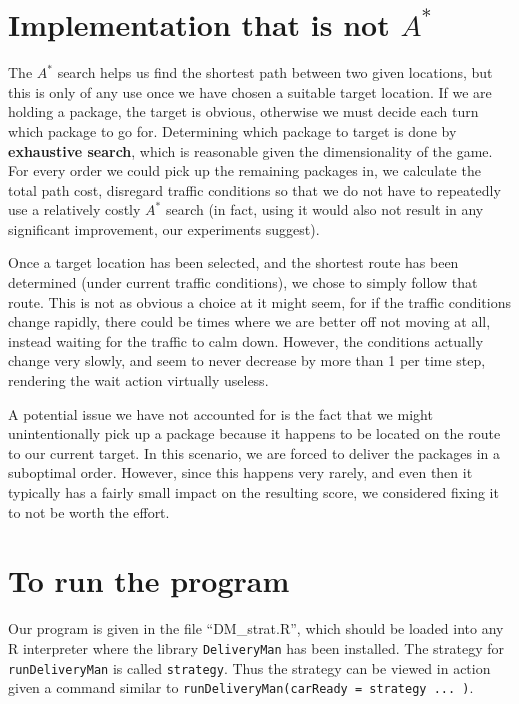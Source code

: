 \section{Implementation that is not $A^*$}

The $A^*$ search helps us find the shortest path between two given locations, but this is only of any use once we have chosen a suitable target location. If we are holding a package, the target is obvious, otherwise we must decide each turn which package to go for. Determining which package to target is done by \textbf{exhaustive search}, which is reasonable given the dimensionality of the game. For every order we could pick up the remaining packages in, we calculate the total path cost, disregard traffic conditions so that we do not have to repeatedly use a relatively costly $A^*$ search (in fact, using it would also not result in any significant improvement, our experiments suggest).

Once a target location has been selected, and the shortest route has been determined (under current traffic conditions), we chose to simply follow that route. This is not as obvious a choice at it might seem, for if the traffic conditions change rapidly, there could be times where we are better off not moving at all, instead waiting for the traffic to calm down. However, the conditions actually change very slowly, and seem to never decrease by more than 1 per time step, rendering the wait action virtually useless.

A potential issue we have not accounted for is the fact that we might unintentionally pick up a package because it happens to be located on the route to our current target. In this scenario, we are forced to deliver the packages in a suboptimal order. However, since this happens very rarely, and even then it typically has a fairly small impact on the resulting score, we considered fixing it to not be worth the effort.

\section{To run the program}

Our program is given in the file ``DM\_strat.R'', which should be loaded into any R interpreter where the library \texttt{DeliveryMan} has been installed. The strategy for \texttt{runDeliveryMan} is called \texttt{strategy}. Thus the strategy can be viewed in action given a command similar to \texttt{runDeliveryMan(carReady = strategy ... )}.